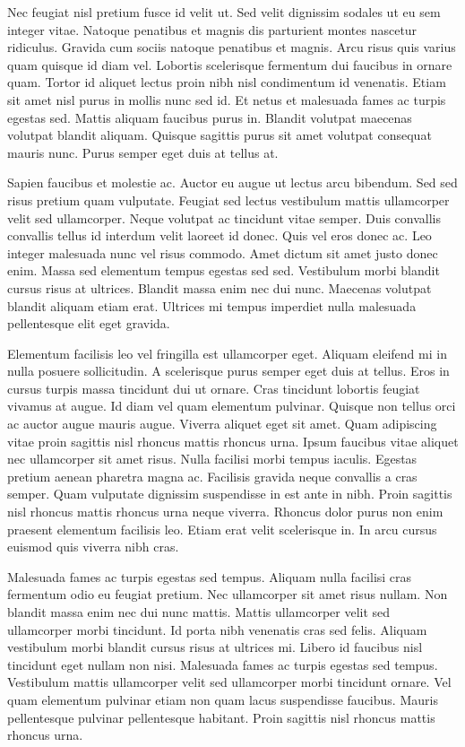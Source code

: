 \documentclass[11pt,a4paper]{article}
\begin{document}
Nec feugiat nisl pretium fusce id velit ut. Sed velit dignissim sodales ut eu sem integer vitae. Natoque penatibus et magnis dis parturient montes nascetur ridiculus. Gravida cum sociis natoque penatibus et magnis. Arcu risus quis varius quam quisque id diam vel. Lobortis scelerisque fermentum dui faucibus in ornare quam. Tortor id aliquet lectus proin nibh nisl condimentum id venenatis. Etiam sit amet nisl purus in mollis nunc sed id. Et netus et malesuada fames ac turpis egestas sed. Mattis aliquam faucibus purus in. Blandit volutpat maecenas volutpat blandit aliquam. Quisque sagittis purus sit amet volutpat consequat mauris nunc. Purus semper eget duis at tellus at.

Sapien faucibus et molestie ac. Auctor eu augue ut lectus arcu bibendum. Sed sed risus pretium quam vulputate. Feugiat sed lectus vestibulum mattis ullamcorper velit sed ullamcorper. Neque volutpat ac tincidunt vitae semper. Duis convallis convallis tellus id interdum velit laoreet id donec. Quis vel eros donec ac. Leo integer malesuada nunc vel risus commodo. Amet dictum sit amet justo donec enim. Massa sed elementum tempus egestas sed sed. Vestibulum morbi blandit cursus risus at ultrices. Blandit massa enim nec dui nunc. Maecenas volutpat blandit aliquam etiam erat. Ultrices mi tempus imperdiet nulla malesuada pellentesque elit eget gravida.

Elementum facilisis leo vel fringilla est ullamcorper eget. Aliquam eleifend mi in nulla posuere sollicitudin. A scelerisque purus semper eget duis at tellus. Eros in cursus turpis massa tincidunt dui ut ornare. Cras tincidunt lobortis feugiat vivamus at augue. Id diam vel quam elementum pulvinar. Quisque non tellus orci ac auctor augue mauris augue. Viverra aliquet eget sit amet. Quam adipiscing vitae proin sagittis nisl rhoncus mattis rhoncus urna. Ipsum faucibus vitae aliquet nec ullamcorper sit amet risus. Nulla facilisi morbi tempus iaculis. Egestas pretium aenean pharetra magna ac. Facilisis gravida neque convallis a cras semper. Quam vulputate dignissim suspendisse in est ante in nibh. Proin sagittis nisl rhoncus mattis rhoncus urna neque viverra. Rhoncus dolor purus non enim praesent elementum facilisis leo. Etiam erat velit scelerisque in. In arcu cursus euismod quis viverra nibh cras.

Malesuada fames ac turpis egestas sed tempus. Aliquam nulla facilisi cras fermentum odio eu feugiat pretium. Nec ullamcorper sit amet risus nullam. Non blandit massa enim nec dui nunc mattis. Mattis ullamcorper velit sed ullamcorper morbi tincidunt. Id porta nibh venenatis cras sed felis. Aliquam vestibulum morbi blandit cursus risus at ultrices mi. Libero id faucibus nisl tincidunt eget nullam non nisi. Malesuada fames ac turpis egestas sed tempus. Vestibulum mattis ullamcorper velit sed ullamcorper morbi tincidunt ornare. Vel quam elementum pulvinar etiam non quam lacus suspendisse faucibus. Mauris pellentesque pulvinar pellentesque habitant. Proin sagittis nisl rhoncus mattis rhoncus urna.
\end{document}
